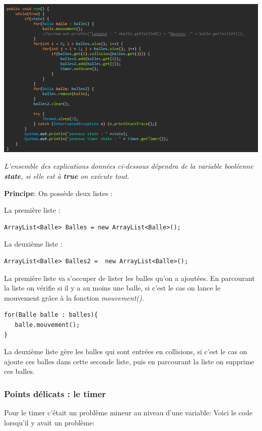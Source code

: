 \documentclass{article}
\begin{document}
\begin{center}
	\includegraphics[scale=0.5]{runMouvement.png}
\end{center}
\textit{L'ensemble des explications données ci-dessous dépendra de la variable booléenne \textbf{state}, si elle est à \textbf{true} on exécute tout.}
	
	
\textbf{Principe}: On possède deux listes : 
\newline
	
La première liste : \begin{verbatim}ArrayList<Balle> Balles = new ArrayList<Balle>();\end{verbatim} 
La deuxième liste : \begin{verbatim}ArrayList<Balle> Balles2 = 	new ArrayList<Balle>();\end{verbatim} 
La première liste va s'occuper de lister les balles qu'on a ajoutées. En parcourant la liste on vérifie si il y a au moins une balle, si c'est le cas on lance le mouvement grâce à la fonction \textit{mouvement()}.

\begin{verbatim}
for(Balle balle : balles){
   balle.mouvement();
}
\end{verbatim}	

La deuxième liste gère les balles qui sont entrées en collisions, si c'est le cas on ajoute ces balles dans cette seconde liste, puis en parcourant la liste on supprime ces balles.


\subsubsection{Points délicats : le timer}
Pour le timer c'était un problème mineur au niveau d'une variable:
Voici le code lorsqu'il y avait un problème:
	
\end{document}
